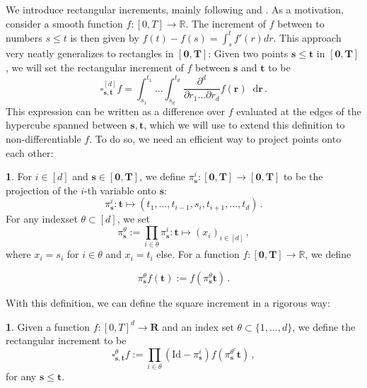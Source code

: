 \documentclass[11pt,oneside,english,reqno]{amsart}
\numberwithin{equation}{section}
\numberwithin{figure}{section}
\theoremstyle{plain}
\theoremstyle{definition}
\newtheorem{defn}[thm]{\protect\definitionname}
\theoremstyle{remark}
\theoremstyle{plain}
\theoremstyle{plain}
\theoremstyle{plain}
\theoremstyle{plain}
\theoremstyle{plain}
\providecommand{\definitionname}{Definition}
\newcommand{\RR}{\mathbb{R}}
\newcommand{\bR}{\mathbf{R}}
\newcommand{\br}{\mathbf{r}}
\newcommand{\bT}{\mathbf{T}}
\newcommand{\bs}{\mathbf{s}}
\newcommand{\bt}{\mathbf{t}}
\newcommand{\Id}{\mathrm{Id}}
\newcommand{\dd}{\mathop{}\!\mathrm{d}}
\begin{document}
\noindent We introduce rectangular increments, mainly following \cite{Harang2021} and \cite{Bechtold2023}. As a motivation, consider a smooth function $f:[0,T]\to\RR$. The increment of $f$ between to numbers $s\le t$ is then given by $f(t)-f(s) = \int_s^t f'(r) dr$. This approach very neatly generalizes to rectangles in $[\mathbf 0,\bT]$: Given two points $\bs\le\bt$ in $[\mathbf 0,\bT]$, we will set the rectangular increment of $f$ between $\bs$ and $\bt$ to be
%
\begin{equation}\label{eq:motivatingIntegrals}
    \square_{\bs,\bt}^{[d]} f = \int_{s_1}^{t_1}\dots\int_{s_d}^{t_d} \frac{\partial^d}{\partial r_1\dots\partial r_d}f(\br)\dd \br\,.
\end{equation}
%
This expression can be written as a difference over $f$ evaluated at the edges of the hypercube spanned between $\bs,\bt$, which we will use to extend this definition to non-differentiable $f$. To do so, we need an efficient way to project points onto each other:

\begin{defn}
    For $i\in[d]$ and $\bs\in[\mathbf 0,\bT]$, we define $\pi^i_\bs :[\mathbf 0,\bT]\to[\mathbf 0,\bT]$ to be the projection of the $i$-th variable onto $\bs$:
%
    \begin{equation*}
        \pi^i_\bs:\bt\mapsto(t_1,\dots, t_{i-1},s_i,t_{i+1},\dots,t_d)\,.
    \end{equation*}
%
    For any indexset $\theta\subset[d]$, we set
%
    \begin{equation*}
        \pi_\bs^\theta := \prod_{i\in\theta}\pi_\bs^i:\bt\mapsto(x_i)_{i\in[d]}\,,
    \end{equation*}
%
    where $x_i = s_i$ for $i\in\theta$ and $x_i = t_i$ else. For a function $f:[\mathbf 0,\bT]\to\RR$, we define

    \begin{equation*}
        \pi_\bs^\theta f(\bt) := f(\pi_\bs^\theta\bt)\,.
    \end{equation*}
\end{defn}
%
\noindent With this definition, we can define the square increment in a rigorous way:
%
\begin{defn}
    Given a function $f:[0,T]^d\to\bR$ and an index set $\theta\subset\{1,...,d\}$, we define the rectangular increment to be
%
    \begin{equation}
        \square_{\bs,\bt}^\theta f := \prod_{i\in\theta}(\Id-\pi^i_\bs)f(\pi^{\theta^c}_\bs \bt)\,,
    \end{equation}
%
    for any $\bs\le \bt$.
\end{defn}
\end{document}
